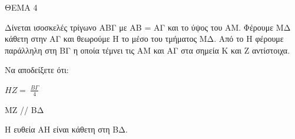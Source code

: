 
ΘΕΜΑ 4

Δίνεται ισοσκελές τρίγωνο ΑΒΓ με ΑΒ = ΑΓ και το ύψος του ΑΜ. Φέρουμε ΜΔ κάθετη στην ΑΓ και θεωρούμε Η το μέσο του τμήματος ΜΔ. Από το Η φέρουμε παράλληλη στη ΒΓ η οποία τέμνει τις ΑΜ και ΑΓ στα σημεία Κ και Ζ αντίστοιχα.

Να αποδείξετε ότι:

\begin{alist}
\item $ΗΖ = \ \frac{Β\Gamma}{4}$ 

\item ΜΖ // ΒΔ 

\item Η ευθεία ΑΗ είναι κάθετη στη ΒΔ. 


\end{alist}
